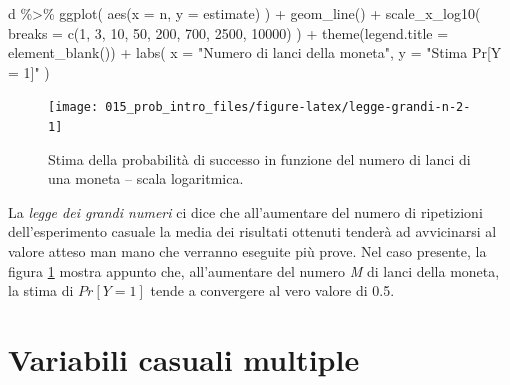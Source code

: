 \documentclass[
  10pt,
  italian,
  a4paper,
  extrafontsizes,onecolumn,openright
  ]{memoir}
\newenvironment{Shaded}{\begin{snugshade}}{\end{snugshade}}
\newcommand{\AttributeTok}[1]{\textcolor[rgb]{0.77,0.63,0.00}{#1}}
\newcommand{\DecValTok}[1]{\textcolor[rgb]{0.00,0.00,0.81}{#1}}
\newcommand{\FunctionTok}[1]{\textcolor[rgb]{0.00,0.00,0.00}{#1}}
\newcommand{\NormalTok}[1]{#1}
\newcommand{\SpecialCharTok}[1]{\textcolor[rgb]{0.00,0.00,0.00}{#1}}
\newcommand{\StringTok}[1]{\textcolor[rgb]{0.31,0.60,0.02}{#1}}
\theoremstyle{definition}
\theoremstyle{definition}
\theoremstyle{definition}
\theoremstyle{definition}
\theoremstyle{remark}
\begin{document}
\begin{Shaded}
\begin{Highlighting}[]
\NormalTok{d }\SpecialCharTok{\%\textgreater{}\%} 
  \FunctionTok{ggplot}\NormalTok{(}
    \FunctionTok{aes}\NormalTok{(}\AttributeTok{x =}\NormalTok{ n, }\AttributeTok{y =}\NormalTok{ estimate)}
\NormalTok{  ) }\SpecialCharTok{+}
  \FunctionTok{geom\_line}\NormalTok{() }\SpecialCharTok{+}
  \FunctionTok{scale\_x\_log10}\NormalTok{(}
    \AttributeTok{breaks =} \FunctionTok{c}\NormalTok{(}\DecValTok{1}\NormalTok{, }\DecValTok{3}\NormalTok{, }\DecValTok{10}\NormalTok{, }\DecValTok{50}\NormalTok{, }\DecValTok{200}\NormalTok{, }
               \DecValTok{700}\NormalTok{, }\DecValTok{2500}\NormalTok{, }\DecValTok{10000}\NormalTok{)}
\NormalTok{  ) }\SpecialCharTok{+}
  \FunctionTok{theme}\NormalTok{(}\AttributeTok{legend.title =} \FunctionTok{element\_blank}\NormalTok{()) }\SpecialCharTok{+}
  \FunctionTok{labs}\NormalTok{(}
    \AttributeTok{x =} \StringTok{"Numero di lanci della moneta"}\NormalTok{, }
    \AttributeTok{y =} \StringTok{"Stima Pr[Y = 1]"}
\NormalTok{)}
\end{Highlighting}
\end{Shaded}

\begin{figure}[h]

{\centering \texttt{[image: 015\_prob\_intro\_files/figure-latex/legge-grandi-n-2-1]} 

}

\caption{Stima della probabilità di successo in funzione del numero di lanci di una moneta -- scala logaritmica.}\label{fig:legge-grandi-n-2}
\end{figure}

La \emph{legge dei grandi numeri} ci dice che all'aumentare del numero di ripetizioni dell'esperimento casuale la media dei risultati ottenuti tenderà ad avvicinarsi al valore atteso man mano che verranno eseguite più prove. Nel caso presente, la figura \ref{fig:legge-grandi-n-2} mostra appunto che, all'aumentare del numero \emph{M} di lanci della moneta, la stima di \(Pr[Y = 1]\) tende a convergere al vero valore di 0.5.

\hypertarget{variabili-casuali-multiple}{%
\section{Variabili casuali multiple}\label{variabili-casuali-multiple}}
\end{document}
